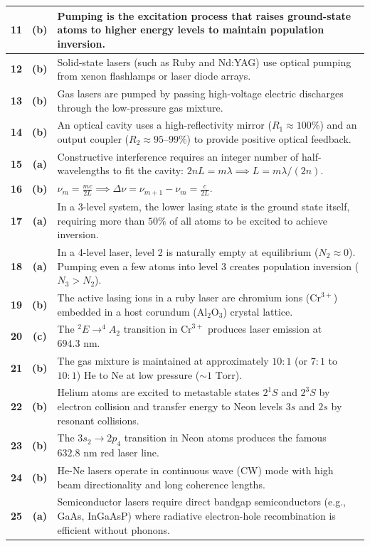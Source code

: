 {\begin{tabularx}{\textwidth}{|c|c|X|}
\textbf{11} & \textbf{(b)} & Pumping is the excitation process that raises ground-state atoms to higher energy levels to maintain population inversion. \\ \hline
\textbf{12} & \textbf{(b)} & Solid-state lasers (such as Ruby and Nd:YAG) use optical pumping from xenon flashlamps or laser diode arrays. \\ \hline
\textbf{13} & \textbf{(b)} & Gas lasers are pumped by passing high-voltage electric discharges through the low-pressure gas mixture. \\ \hline
\textbf{14} & \textbf{(b)} & An optical cavity uses a high-reflectivity mirror ($R_1 \approx 100\%$) and an output coupler ($R_2 \approx 95\text{--}99\%$) to provide positive optical feedback. \\ \hline
\textbf{15} & \textbf{(a)} & Constructive interference requires an integer number of half-wavelengths to fit the cavity: $2nL = m\lambda \implies L = m\lambda/(2n)$. \\ \hline
\textbf{16} & \textbf{(b)} & $\nu_m = \frac{m c}{2L} \implies \Delta\nu = \nu_{m+1} - \nu_m = \frac{c}{2L}$. \\ \hline
\textbf{17} & \textbf{(a)} & In a 3-level system, the lower lasing state is the ground state itself, requiring more than $50\%$ of all atoms to be excited to achieve inversion. \\ \hline
\textbf{18} & \textbf{(a)} & In a 4-level laser, level 2 is naturally empty at equilibrium ($N_2 \approx 0$). Pumping even a few atoms into level 3 creates population inversion ($N_3 > N_2$). \\ \hline
\textbf{19} & \textbf{(b)} & The active lasing ions in a ruby laser are chromium ions ($\text{Cr}^{3+}$) embedded in a host corundum ($\text{Al}_2\text{O}_3$) crystal lattice. \\ \hline
\textbf{20} & \textbf{(c)} & The $^2E \to ^4A_2$ transition in $\text{Cr}^{3+}$ produces laser emission at $694.3\text{ nm}$. \\ \hline
\textbf{21} & \textbf{(b)} & The gas mixture is maintained at approximately $10:1$ (or $7:1$ to $10:1$) He to Ne at low pressure ($\sim 1\text{ Torr}$). \\ \hline
\textbf{22} & \textbf{(b)} & Helium atoms are excited to metastable states $2^1S$ and $2^3S$ by electron collision and transfer energy to Neon levels $3s$ and $2s$ by resonant collisions. \\ \hline
\textbf{23} & \textbf{(b)} & The $3s_2 \to 2p_4$ transition in Neon atoms produces the famous $632.8\text{ nm}$ red laser line. \\ \hline
\textbf{24} & \textbf{(b)} & He-Ne lasers operate in continuous wave (CW) mode with high beam directionality and long coherence lengths. \\ \hline
\textbf{25} & \textbf{(a)} & Semiconductor lasers require direct bandgap semiconductors (e.g., GaAs, InGaAsP) where radiative electron-hole recombination is efficient without phonons. \\ \hline
\end{tabularx}
}

